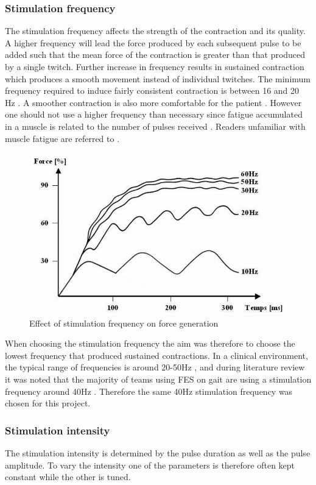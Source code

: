 \subsubsection{Stimulation frequency}
The stimulation frequency affects the strength of the contraction and its quality. A higher frequency will lead the force produced by each subsequent pulse to be added such that the mean force of the contraction is greater than that produced by a single twitch. Further increase in frequency results in sustained contraction which produces a smooth movement instead of individual twitches. The minimum frequency required to induce fairly consistent contraction is between 16 and 20 Hz \cite{marquez-chin_functional_2020}. A smoother contraction is also more comfortable for the patient . However one should not use a higher frequency than necessary since fatigue accumulated in a muscle is related to the number of pulses received \cite{bigland-ritchie_muscle_2000}. Readers unfamiliar with muscle fatigue are referred to .

\begin{figure} [H]
    \centering
    \includegraphics[width=0.7\linewidth]{images/stimfreq.png}
    \caption{Effect of stimulation frequency on force generation \cite{metrailler_systeme_2005}}
    \label{fig:stimfreq}
\end{figure}

When choosing the stimulation frequency the aim was therefore to choose the lowest frequency that produced sustained contractions. In a clinical environment, the typical range of frequencies is around 20-50Hz , and during literature review it was noted that the majority of teams using FES on gait are using a stimulation frequency around 40Hz \cite{aout_effects_2023}. Therefore the same 40Hz stimulation frequency was chosen for this project.



\subsubsection{Stimulation intensity }
The stimulation intensity is determined by the pulse duration as well as the pulse amplitude. To vary the intensity one of the parameters is therefore often kept constant while the other is tuned. 

